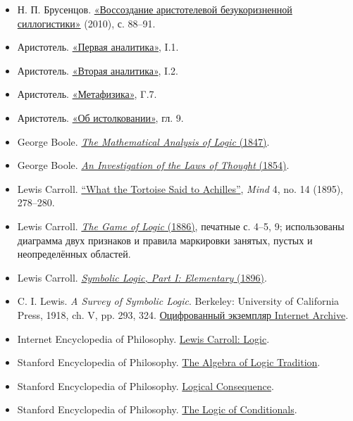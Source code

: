 \documentclass[12pt,a4paper]{article}
\begin{document}
\begin{itemize}
\item Н. П. Брусенцов. \href{https://ternarycomp.cs.msu.ru/Papers/brusentsov_sborn2010_2.pdf}{«Воссоздание аристотелевой безукоризненной силлогистики»} (2010), с. 88–91.
\item Аристотель. \href{https://classics.mit.edu/Aristotle/prior.1.i.html}{«Первая аналитика»}, I.1.
\item Аристотель. \href{https://classics.mit.edu/Aristotle/posterior.1.i.html}{«Вторая аналитика»}, I.2.
\item Аристотель. \href{https://aristotle.johnhboyer.com/Meta/book/4/}{«Метафизика»}, Γ.7.
\item Аристотель. \href{https://www.st-andrews.ac.uk/~mnat/~ball0888/salamis/interpretatione.html}{«Об истолковании»}, гл. 9.
\item George Boole. \href{https://www.gutenberg.org/ebooks/36884}{\emph{The Mathematical Analysis of Logic} (1847)}.
\item George Boole. \href{https://www.gutenberg.org/ebooks/15114}{\emph{An Investigation of the Laws of Thought} (1854)}.
\item Lewis Carroll. \href{https://fair-use.org/mind/1895/04/what-the-tortoise-said-to-achilles}{“What the Tortoise Said to Achilles”}, \emph{Mind} 4, no. 14 (1895), 278–280.
\item Lewis Carroll. \href{https://archive.org/details/gameoflogic00carrrich}{\emph{The Game of Logic} (1886)}, печатные с. 4–5, 9; использованы диаграмма двух признаков и правила маркировки занятых, пустых и неопределённых областей.
\item Lewis Carroll. \href{https://archive.org/details/symboliclogicpa00carrgoog}{\emph{Symbolic Logic, Part I: Elementary} (1896)}.
\item C. I. Lewis. \emph{A Survey of Symbolic Logic}. Berkeley: University of California Press, 1918, ch. V, pp. 293, 324. \href{https://archive.org/details/surveyofsymbolic00lewiiala}{Оцифрованный экземпляр Internet Archive}.
\item Internet Encyclopedia of Philosophy. \href{https://iep.utm.edu/lewis-carroll-logic/}{Lewis Carroll: Logic}.
\item Stanford Encyclopedia of Philosophy. \href{https://plato.stanford.edu/entries/algebra-logic-tradition/}{The Algebra of Logic Tradition}.
\item Stanford Encyclopedia of Philosophy. \href{https://plato.stanford.edu/entries/logical-consequence/}{Logical Consequence}.
\item Stanford Encyclopedia of Philosophy. \href{https://plato.stanford.edu/entries/logic-conditionals/}{The Logic of Conditionals}.

\end{itemize}
\end{document}
